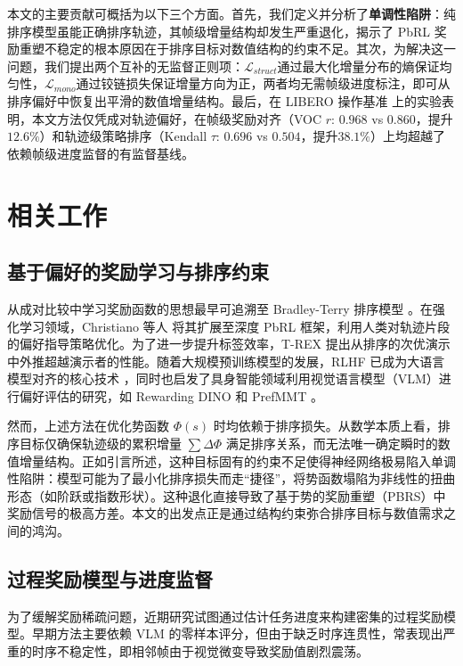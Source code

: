 本文的主要贡献可概括为以下三个方面。首先，我们定义并分析了\textbf{单调性陷阱}：纯排序模型虽能正确排序轨迹，其帧级增量结构却发生严重退化，揭示了 PbRL 奖励重塑不稳定的根本原因在于排序目标对数值结构的约束不足。其次，为解决这一问题，我们提出两个互补的无监督正则项：$\mathcal{L}_{struct}$通过最大化增量分布的熵保证均匀性，$\mathcal{L}_{mono}$通过铰链损失保证增量方向为正，两者均无需帧级进度标注，即可从排序偏好中恢复出平滑的数值增量结构。最后，在 LIBERO 操作基准 \cite{liu2023libero} 上的实验表明，本文方法仅凭成对轨迹偏好，在帧级奖励对齐（VOC $r$: $0.968$ vs $0.860$，提升$12.6\%$）和轨迹级策略排序（Kendall $\tau$: $0.696$ vs $0.504$，提升$38.1\%$）上均超越了依赖帧级进度监督的有监督基线。

\section{相关工作}

\subsection{基于偏好的奖励学习与排序约束}

从成对比较中学习奖励函数的思想最早可追溯至 Bradley-Terry 排序模型 \cite{bradley1952}。在强化学习领域，Christiano 等人 \cite{christiano2017deep} 将其扩展至深度 PbRL 框架，利用人类对轨迹片段的偏好指导策略优化。为了进一步提升标签效率，T-REX \cite{brown2019extrapolating} 提出从排序的次优演示中外推超越演示者的性能。随着大规模预训练模型的发展，RLHF 已成为大语言模型对齐的核心技术 \cite{ouyang2022training}，同时也启发了具身智能领域利用视觉语言模型（VLM）进行偏好评估的研究，如 Rewarding DINO \cite{krack2026rewarding} 和 PrefMMT \cite{zhao2025}。

然而，上述方法在优化势函数 $\Phi(s)$ 时均依赖于排序损失。从数学本质上看，排序目标仅确保轨迹级的累积增量 $\sum \Delta\Phi$ 满足排序关系，而无法唯一确定瞬时的数值增量结构。正如引言所述，这种目标固有的约束不足使得神经网络极易陷入单调性陷阱：模型可能为了最小化排序损失而走“捷径”，将势函数塌陷为非线性的扭曲形态（如阶跃或指数形状）。这种退化直接导致了基于势的奖励重塑（PBRS）中奖励信号的极高方差。本文的出发点正是通过结构约束弥合排序目标与数值需求之间的鸿沟。

\subsection{过程奖励模型与进度监督}

为了缓解奖励稀疏问题，近期研究试图通过估计任务进度来构建密集的过程奖励模型。早期方法主要依赖 VLM 的零样本评分，但由于缺乏时序连贯性，常表现出严重的时序不稳定性，即相邻帧由于视觉微变导致奖励值剧烈震荡。

